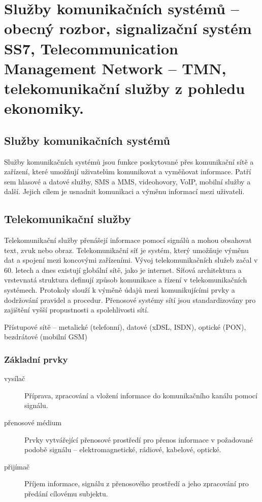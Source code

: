 \section{Služby komunikačních systémů -- obecný rozbor, signalizační systém SS7, Telecommunication Management Network -- TMN, telekomunikační služby z pohledu ekonomiky.}

\subsection{Služby komunikačních systémů}
Služby komunikačních systémů jsou funkce poskytované přes komunikační sítě a zařízení, které umožňují uživatelům komunikovat a vyměňovat informace. Patří sem hlasové a datové služby, SMS a MMS, videohovory, VoIP, mobilní služby a další. Jejich cílem je usnadnit komunikaci a výměnu informací mezi uživateli.

\subsection{Telekomunikační služby}
Telekomunikační služby přenášejí informace pomocí signálů a mohou obsahovat text, zvuk nebo obraz. Telekomunikační síť je systém, který umožňuje výměnu dat a spojení mezi koncovými zařízeními. Vývoj telekomunikačních služeb začal v 60. letech a dnes existují globální sítě, jako je internet. Síťová architektura a vrstevnatá struktura definují způsob komunikace a řízení v telekomunikačních systémech. Protokoly slouží k výměně údajů mezi komunikujícími prvky a dodržování pravidel a procedur. Přenosové systémy sítí jsou standardizovány pro zajištění vyšší propustnosti a spolehlivosti sítí.

Přístupové sítě -- metalické (telefonní), datové (xDSL, ISDN), optické (PON), bezdrátové (mobilní GSM)

\subsubsection{Základní prvky}
\begin{description}
    \item[vysílač] Příprava, zpracování a vložení informace do komunikačního kanálu pomocí signálu.
    \item[přenosové médium] Prvky vytvářející přenosové prostředí pro přenos informace v požadované podobě signálu -- elektromagnetické, rádiové, kabelové, optické.
    \item[přijímač] Příjem informace, signálu z přenosového prostředí a jeho zpracování pro předání cílovému subjektu.
\end{description}

